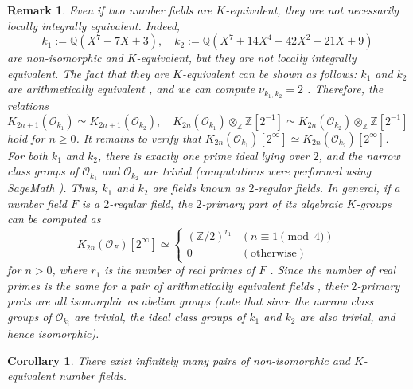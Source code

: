 \documentclass{article}
\numberwithin{equation}{section} %
\newtheorem{cor}[lemm]{Corollary}
\newtheorem{rem}{Remark}
\begin{document}
\begin{rem}
  Even if two number fields are $K$-equivalent, they are not necessarily locally integrally equivalent. Indeed,
  \[
    k_1 := \mathbb{Q}(X^7 - 7X + 3), \quad k_2 := \mathbb{Q}(X^7 + 14X^4 - 42X^2 - 21X + 9)
  \]
  are non-isomorphic and $K$-equivalent, but they are not locally integrally equivalent. The fact that they are $K$-equivalent can be shown as follows: $k_1$ and $k_2$ are arithmetically equivalent \cite{Perlis}, and we can compute $\nu_{k_1,k_2} = 2$ \cite[Example 1]{Perlis2}. Therefore, the relations
  \[
    K_{2n+1}(\mathcal{O}_{k_1}) \simeq K_{2n+1}(\mathcal{O}_{k_2}), \quad K_{2n}(\mathcal{O}_{k_1}) \otimes_{\mathbb{Z}} \mathbb{Z}[2^{-1}] \simeq K_{2n}(\mathcal{O}_{k_2}) \otimes_{\mathbb{Z}} \mathbb{Z}[2^{-1}]
  \]
  hold for $n \geq 0$. It remains to verify that $K_{2n}(\mathcal{O}_{k_1})[2^\infty] \simeq K_{2n}(\mathcal{O}_{k_2})[2^\infty]$. For both $k_1$ and $k_2$, there is exactly one prime ideal lying over $2$, and the narrow class groups of $\mathcal{O}_{k_1}$ and $\mathcal{O}_{k_2}$ are trivial (computations were performed using SageMath \cite{Sage}). Thus, $k_1$ and $k_2$ are fields known as $2$-regular fields. In general, if a number field $F$ is a $2$-regular field, the $2$-primary part of its algebraic $K$-groups can be computed as
  \[
    K_{2n}(\mathcal{O}_F)[2^\infty] \simeq \begin{cases}
        (\mathbb{Z}/2)^{r_1} & (n\equiv 1 \pmod{4}) \\
        0 & (\text{otherwise})
    \end{cases}
  \]
  for $n > 0$, where $r_1$ is the number of real primes of $F$ \cite[Example 89]{Weibel3}. Since the number of real primes is the same for a pair of arithmetically equivalent fields \cite[Theorem 1]{Perlis}, their $2$-primary parts are all isomorphic as abelian groups (note that since the narrow class groups of $\mathcal{O}_{k_i}$ are trivial, the ideal class groups of $k_1$ and $k_2$ are also trivial, and hence isomorphic).
\end{rem}

\begin{cor}
  \label{rhgtiwo94gniojwtnjowt}
  There exist infinitely many pairs of non-isomorphic and $K$-equivalent number fields.
\end{cor}
\end{document}
